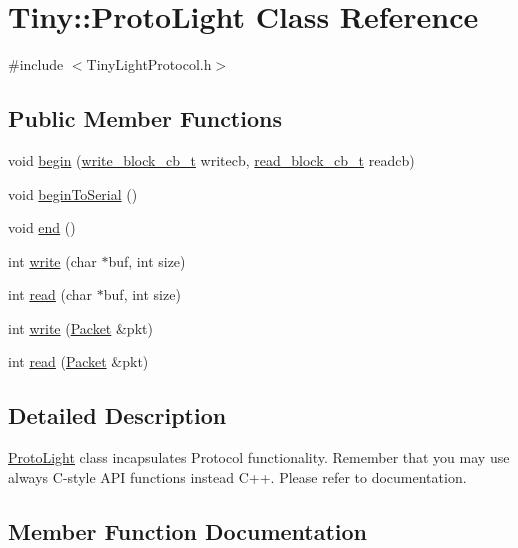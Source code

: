 \hypertarget{classTiny_1_1ProtoLight}{}\section{Tiny\+:\+:Proto\+Light Class Reference}
\label{classTiny_1_1ProtoLight}


{\ttfamily \#include $<$Tiny\+Light\+Protocol.\+h$>$}

\subsection*{Public Member Functions}
\begin{DoxyCompactItemize}
\item 
void \hyperlink{classTiny_1_1ProtoLight_ad27dfcef54a8316228469ef0a4267962}{begin} (\hyperlink{tiny__proto__types_8h_a7f69e669de5baa69a43ee5cb439a7496}{write\+\_\+block\+\_\+cb\+\_\+t} writecb, \hyperlink{tiny__proto__types_8h_ae3d867e030f59de94508902f2b84a7ec}{read\+\_\+block\+\_\+cb\+\_\+t} readcb)
\item 
void \hyperlink{classTiny_1_1ProtoLight_a50bf63fe1891edda48980ca2893485d7}{begin\+To\+Serial} ()
\item 
void \hyperlink{classTiny_1_1ProtoLight_a948b2a0e37177b7434581adc64b36497}{end} ()
\item 
int \hyperlink{classTiny_1_1ProtoLight_a46a27ee9d0b55c88672c98abf04dbdce}{write} (char $\ast$buf, int size)
\item 
int \hyperlink{classTiny_1_1ProtoLight_acf18a8b73ee6c6394270c903ad7882b8}{read} (char $\ast$buf, int size)
\item 
int \hyperlink{classTiny_1_1ProtoLight_abf2966531f8ed7dba44079f00eefded2}{write} (\hyperlink{classTiny_1_1Packet}{Packet} \&pkt)
\item 
int \hyperlink{classTiny_1_1ProtoLight_a96c56b10b4eee28c09b291461c66fa54}{read} (\hyperlink{classTiny_1_1Packet}{Packet} \&pkt)
\end{DoxyCompactItemize}


\subsection{Detailed Description}
\hyperlink{classTiny_1_1ProtoLight}{Proto\+Light} class incapsulates Protocol functionality. Remember that you may use always C-\/style A\+PI functions instead C++. Please refer to documentation. 

\subsection{Member Function Documentation}
\mbox{\label{classTiny_1_1ProtoLight_ad27dfcef54a8316228469ef0a4267962}} 
